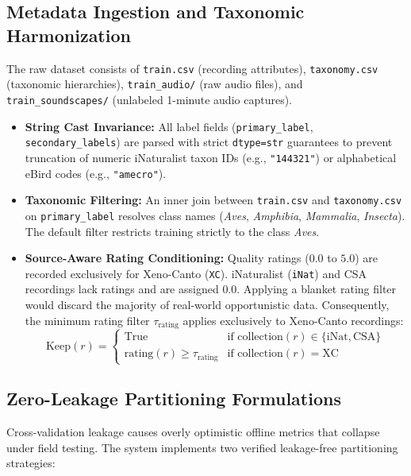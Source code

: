 \documentclass[11pt,a4paper]{article}
\begin{document}
\subsection{Metadata Ingestion and Taxonomic Harmonization}
The raw dataset consists of \texttt{train.csv} (recording attributes), \texttt{taxonomy.csv} (taxonomic hierarchies), \texttt{train\_audio/} (raw audio files), and \texttt{train\_soundscapes/} (unlabeled 1-minute audio captures). 
\begin{itemize}[leftmargin=*]
    \item \textbf{String Cast Invariance:} All label fields (\texttt{primary\_label}, \texttt{secondary\_labels}) are parsed with strict \texttt{dtype=str} guarantees to prevent truncation of numeric iNaturalist taxon IDs (e.g., \texttt{"144321"}) or alphabetical eBird codes (e.g., \texttt{"amecro"}).
    \item \textbf{Taxonomic Filtering:} An inner join between \texttt{train.csv} and \texttt{taxonomy.csv} on \texttt{primary\_label} resolves class names (\textit{Aves}, \textit{Amphibia}, \textit{Mammalia}, \textit{Insecta}). The default filter restricts training strictly to the class \textit{Aves}.
    \item \textbf{Source-Aware Rating Conditioning:} Quality ratings ($0.0$ to $5.0$) are recorded exclusively for Xeno-Canto (\texttt{XC}). iNaturalist (\texttt{iNat}) and CSA recordings lack ratings and are assigned $0.0$. Applying a blanket rating filter would discard the majority of real-world opportunistic data. Consequently, the minimum rating filter $\tau_{\text{rating}}$ applies exclusively to Xeno-Canto recordings:
    \begin{equation}
        \text{Keep}(r) = \begin{cases} 
            \text{True} & \text{if } \text{collection}(r) \in \{\text{iNat}, \text{CSA}\} \\
            \text{rating}(r) \ge \tau_{\text{rating}} & \text{if } \text{collection}(r) = \text{XC}
        \end{cases}
    \end{equation}
\end{itemize}

\subsection{Zero-Leakage Partitioning Formulations}
Cross-validation leakage causes overly optimistic offline metrics that collapse under field testing. The system implements two verified leakage-free partitioning strategies:
\end{document}
